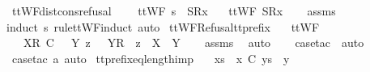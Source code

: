 \endisatagproof
{\isafoldproof}%
%
\isadelimproof
\isanewline
%
\endisadelimproof
\isanewline
{}\isamarkupfalse%
\ ttWF{\isacharunderscore}dist{\isacharunderscore}cons{\isacharunderscore}refusal{\isacharcolon}\ \isanewline
\ \ \ {\isachardoublequoteopen}ttWF\ {\isacharparenleft}s\ {\isacharat}\ {\isacharbrackleft}{\isacharbrackleft}S{\isacharbrackright}\isactrlsub R{\isacharcomma}x{\isacharbrackright}{\isacharparenright}{\isachardoublequoteclose}\isanewline
\ \ \ {\isachardoublequoteopen}ttWF\ {\isacharbrackleft}{\isacharbrackleft}S{\isacharbrackright}\isactrlsub R{\isacharcomma}x{\isacharbrackright}{\isachardoublequoteclose}\isanewline
%
\isadelimproof
\ \ %
\endisadelimproof
%
\isatagproof
{}\isamarkupfalse%
\ assms\ \isamarkupfalse%
{\isacharparenleft}induct\ s\ rule{\isacharcolon}ttWF{\isachardot}induct{\isacharcomma}\ auto{\isacharparenright}%
\endisatagproof
{\isafoldproof}%
%
\isadelimproof
\isanewline
%
\endisadelimproof
\isanewline
{}\isamarkupfalse%
\ ttWF{\isacharunderscore}Refusal{\isacharunderscore}tt{\isacharunderscore}prefix{\isacharcolon}\isanewline
\ \ \ {\isachardoublequoteopen}ttWF\ {\isasymsigma}{\isachardoublequoteclose}\isanewline
\ \ \ {\isachardoublequoteopen}{\isacharbrackleft}{\isacharbrackleft}X{\isacharbrackright}\isactrlsub R{\isacharbrackright}\ {\isasymlesssim}\isactrlsub C\ {\isasymsigma}\ {\isacharequal}\ {\isacharparenleft}{\isasymexists}Y\ z{\isachardot}\ {\isasymsigma}\ {\isacharequal}\ {\isacharparenleft}{\isacharbrackleft}{\isacharbrackleft}Y{\isacharbrackright}\isactrlsub R{\isacharbrackright}\ {\isacharat}\ z{\isacharparenright}\ {\isasymand}\ X\ {\isasymsubseteq}\ Y{\isacharparenright}{\isachardoublequoteclose}\isanewline
%
\isadelimproof
\ \ %
\endisadelimproof
%
\isatagproof
{}\isamarkupfalse%
\ assms\ \isamarkupfalse%
\ auto\isanewline
\ \ \isamarkupfalse%
\ {\isacharparenleft}case{\isacharunderscore}tac\ {\isasymsigma}{\isacharcomma}\ auto{\isacharparenright}\isanewline
\ \ \isamarkupfalse%
\ {\isacharparenleft}case{\isacharunderscore}tac\ a{\isacharcomma}\ auto{\isacharparenright}%
\endisatagproof
{\isafoldproof}%
%
\isadelimproof
\isanewline
%
\endisadelimproof
\isanewline
{}\isamarkupfalse%
\ tt{\isacharunderscore}prefix{\isacharunderscore}eq{\isacharunderscore}length{\isacharunderscore}imp{\isacharcolon}\isanewline
\ \ \ {\isachardoublequoteopen}xs\ {\isacharat}\ {\isacharbrackleft}x{\isacharbrackright}\ {\isasymlesssim}\isactrlsub C\ ys\ {\isacharat}\ {\isacharbrackleft}y{\isacharbrackright}{\isachardoublequoteclose}\isanewline

